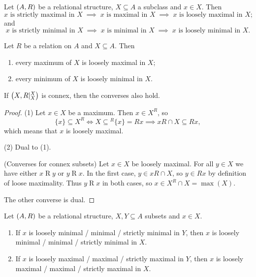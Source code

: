 \begin{lemma} \label{maximalMinimalImplications}
Let $\left( A, R \right)$ be a relational structure, $X\subseteq A$ a subclass and $x\in X$. Then
\[ \text{$x$ is strictly maximal in $X$} \;\implies\; \text{$x$ is maximal in $X$} \;\implies\; \text{$x$ is loosely maximal in $X$}; \]
and
\[ \text{$x$ is strictly minimal in $X$} \;\implies\; \text{$x$ is minimal in $X$} \;\implies\; \text{$x$ is loosely minimal in $X$}. \]
\end{lemma}

\begin{lemma} \label{maximumIsMaximal}
Let $R$ be a relation on $A$ and $X\subseteq A$. Then
\begin{enumerate}
\item every maximum of $X$ is loosely maximal in $X$;
\item every minimum of $X$ is loosely minimal in $X$.
\end{enumerate}
If $\left( X, R|_X^X \right)$ is connex, then the converses also hold.
\end{lemma}
\begin{proof}
(1) Let $x\in X$ be a maximum. Then $x\in X^R$, so
\[ \{x\} \subseteq X^R \iff X\subseteq {^R\{x\}} = Rx \implies xR \cap X \subseteq Rx, \]
which means that $x$ is loosely maximal.

(2) Dual to (1).

(Converses for connex subsets) Let $x\in X$ be loosely maximal. For all $y\in X$ we have either $x\mathrel{R}y$ or $y\mathrel{R}x$. In the first case, $y\in xR\cap X$, so $y\in Rx$ by definition of loose maximality. Thus $y\mathrel{R}x$ in both cases, so $x\in X^R\cap X = \max(X)$.

The other converse is dual.
\end{proof}

\begin{lemma} \label{minimalMaximalSubset}
Let $\left( A,R \right)$ be a relational structure, $X, Y\subseteq A$ subsets and $x\in X$.
\begin{enumerate}
\item If $x$ is loosely minimal / minimal / strictly minimal in $Y$, then $x$ is loosely minimal / minimal / strictly minimal in $X$.
\item If $x$ is loosely maximal / maximal / strictly maximal in $Y$, then $x$ is loosely maximal / maximal / strictly maximal in $X$.
\end{enumerate}
\end{lemma}

